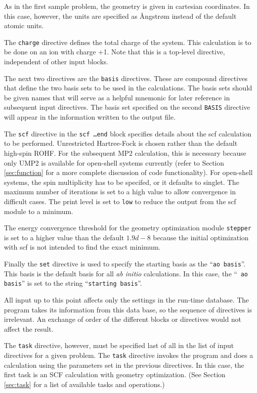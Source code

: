 As in the first sample problem, the geometry is given in cartesian 
coordinates.  In this case, however, the units are specified as
{\AA}ngstr{\o}m instead of the default atomic units.

The {\tt charge} directive defines the total charge of the system.  This calculation is to be done on an ion with charge +1. Note that this is a top-level
directive, independent of other input blocks.

The next two directives are the {\tt basis} directives.  These are compound
directives that define the two basis sets to be used in the calculations.  
The basis sets should be given names that will serve as a helpful mnemonic 
for later reference in
subsequent input directives.  The basis set specified on the second 
\verb+BASIS+ directive will appear in the information
written to the output file.

The {\tt scf} directive in the {\tt scf \ldots end} block specifies 
details about the scf
calculation to be performed. Unrestricted Hartree-Fock is chosen
rather than the default high-spin ROHF. For the subsequent MP2
calculation, this is necessary because only UMP2 is available for
open-shell systems currently (refer to Section \ref{sec:function} for
a more complete discussion of code functionality). For open-shell 
systems, the spin
multiplicity has to be specifed, or it defaults to singlet. The maximum
number of iterations is set to a high value to allow convergence in
difficult cases. The print level is set to {\tt low} to reduce the
output from the scf module to a minimum.

The energy convergence threshold for the geometry optimization module
{\tt stepper} is set to a higher value than the default $1.9d-8$
because the initial optimization with scf is not intended to find the
exact minimum.

Finally the {\tt set} directive is used to specify the
starting basis as the ``{\tt ao basis}''.  This basis is the default
basis for all {\em ab initio} calculations.  In this case, the ``{\tt
ao basis}'' is set to the string ``{\tt starting basis}''.

All input up to this point affects only the settings in the run-time database.
The program takes its information from this data base, so the
sequence of directives is irrelevant.  An exchange of order of the 
different blocks or
directives would not affect the result. 

The {\tt task} directive, however, must be specified last of all in the
list of input directives for
a given problem. The {\tt task} directive invokes the program and does a calculation
using the parameters set in the previous directives. In this case, the 
first task is an SCF calculation with geometry optimization.   (See Section 
\ref{sec:task} for a list of available 
tasks and operations.)

